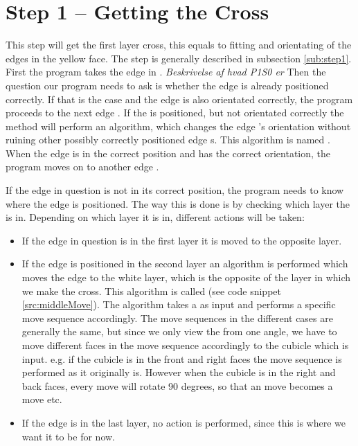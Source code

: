 \section{Step 1 -- Getting the Cross}
This step will get the first layer cross, this equals to fitting and orientating of the edges in the yellow face. 
The step is generally described in subsection \ref{sub:step1}.
First the program takes the edge \cubie{} in \cubicle{} . \emph{Beskrivelse af hvad P1S0 er}
Then the question our program needs to ask is whether the edge \cpiece{} is already positioned correctly.
If that is the case and the edge \cpiece{} is also orientated correctly, the program proceeds to the next edge \cpiece{}.
If the \cubicle{} is positioned, but not orientated correctly the method will perform an algorithm, which changes the edge \cpiece{}'s orientation without ruining other possibly correctly positioned edge \cpiece{}s. 
This algorithm is named . When the edge \cpiece{} is in the correct position and has the correct orientation, the program moves on to another edge \cpiece{}. 

If the edge \cpiece{} in question is not in its correct position, the program needs to know where the edge is positioned.
The way this is done is by checking which layer the \cubie{} is in.
Depending on which layer it is in, different actions will be taken:
\begin{itemize}
	\item If the edge \cpiece{} in question is in the first layer it is moved to the opposite layer.
	\item If the edge \cpiece{} is positioned in the second layer an algorithm is performed which moves the edge \cpiece{} to the white layer, which is the opposite of the layer in which we make the cross. This algorithm is called  (see code snippet \ref{src:middleMove}). The algorithm takes a \cubicle{} as input and performs a specific move sequence accordingly. The move sequences in the different cases are generally the same, but since we only view the \rubik{} from one angle, we have to move different faces in the move sequence accordingly to the cubicle which is input. e.g. if the cubicle is in the front and right faces the move sequence is performed as it originally is. However when the cubicle is in the right and back faces, every move will rotate 90 degrees, so that an  move becomes a  move etc.
	\item If the edge \cubie{} is in the last layer, no action is performed, since this is where we want it to be for now.
\end{itemize}

